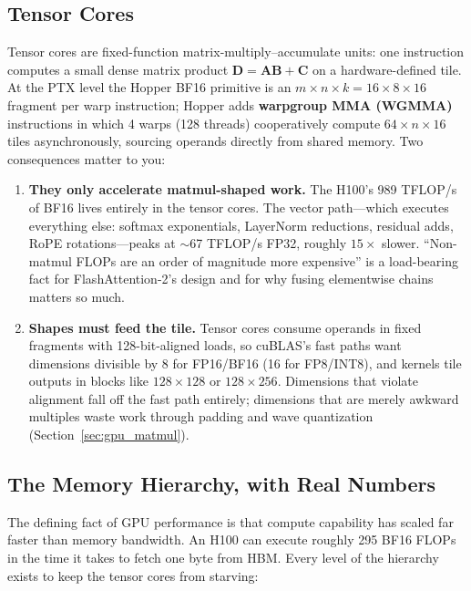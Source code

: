 \subsection{Tensor Cores}

Tensor cores are fixed-function matrix-multiply--accumulate units: one instruction computes a small dense matrix product $\mathbf{D} = \mathbf{A}\mathbf{B} + \mathbf{C}$ on a hardware-defined tile. At the PTX level the Hopper BF16 primitive is an $m{\times}n{\times}k = 16{\times}8{\times}16$ fragment per warp instruction; Hopper adds \textbf{warpgroup MMA (WGMMA)} instructions in which 4 warps (128 threads) cooperatively compute $64{\times}n{\times}16$ tiles asynchronously, sourcing operands directly from shared memory. Two consequences matter to you:

\begin{enumerate}
    \item \textbf{They only accelerate matmul-shaped work.} The H100's 989 TFLOP/s of BF16 lives entirely in the tensor cores. The vector path---which executes everything else: softmax exponentials, LayerNorm reductions, residual adds, RoPE rotations---peaks at $\sim$67 TFLOP/s FP32, roughly $15\times$ slower. ``Non-matmul FLOPs are an order of magnitude more expensive'' is a load-bearing fact for FlashAttention-2's design and for why fusing elementwise chains matters so much.
    \item \textbf{Shapes must feed the tile.} Tensor cores consume operands in fixed fragments with 128-bit-aligned loads, so cuBLAS's fast paths want dimensions divisible by 8 for FP16/BF16 (16 for FP8/INT8), and kernels tile outputs in blocks like $128\times128$ or $128\times256$. Dimensions that violate alignment fall off the fast path entirely; dimensions that are merely awkward multiples waste work through padding and wave quantization (Section~\ref{sec:gpu_matmul}).
\end{enumerate}

\subsection{The Memory Hierarchy, with Real Numbers}

The defining fact of GPU performance is that compute capability has scaled far faster than memory bandwidth. An H100 can execute roughly 295 BF16 FLOPs in the time it takes to fetch one byte from HBM. Every level of the hierarchy exists to keep the tensor cores from starving:

